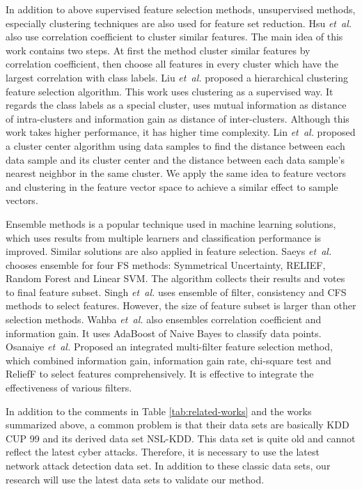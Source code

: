 \documentclass{ieeeaccess}
\theoremstyle{definition}
\begin{document}
In addition to above supervised feature selection methods, unsupervised methods, especially clustering techniques are also used for feature set reduction. 
Hsu \emph{et~al.} \cite{Hsu2010} also use correlation coefficient to cluster similar features. The main idea of this work contains two steps. At first the method cluster similar features by correlation coefficient, then choose all features in every cluster which have the largest correlation with class labels. 
Liu \emph{et~al.} \cite{Liu2011} proposed a hierarchical clustering feature selection algorithm. This work uses clustering as a supervised way. It regards the class labels as a special cluster, uses mutual information as distance of intra-clusters and information gain as distance of inter-clusters. Although this work takes higher performance, it has higher time complexity. 
Lin \emph{et~al.} \cite {CANN2015} proposed a cluster center algorithm using data samples to find the distance between each data sample and its cluster center and the distance between each data sample's nearest neighbor in the same cluster. We apply the same idea to feature vectors and clustering in the feature vector space to achieve a similar effect to sample vectors.

Ensemble methods is a popular technique used in machine learning solutions, which uses results from multiple learners and classification performance is improved. Similar solutions are also applied in feature selection. 
Saeys \emph{et~al.} \cite{Saeys2008} chooses ensemble for four FS methods: Symmetrical Uncertainty, RELIEF, Random Forest and Linear SVM. The algorithm collects their results and votes to final feature subset.
Singh \emph{et~al.} \cite{Singh2015} uses ensemble of filter, consistency and CFS methods to select features. However, the size of feature subset is larger than other selection methods.
Wahba \emph{et~al.} \cite{Wahba2015} also ensembles correlation coefficient and information gain. It uses AdaBoost of Naive Bayes to classify data points. 
Osanaiye \emph{et~al.} \cite{Osanaiye2016} Proposed an integrated multi-filter feature selection method, which combined information gain, information gain rate, chi-square test and ReliefF to select features comprehensively. It is effective to integrate the effectiveness of various filters.



In addition to the comments in Table \ref{tab:related-works} and the works summarized above, a common problem is that their data sets are basically KDD CUP 99 and its derived data set NSL-KDD. This data set is quite old and cannot reflect the latest cyber attacks. Therefore, it is necessary to use the latest network attack detection data set. In addition to these classic data sets, our research will use the latest data sets to validate our method.
\end{document}
